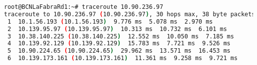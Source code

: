 \begin{lstlisting}[language=bash, caption={Traceroute from BCNLaFrabraRd1 to LEDE-MXN1.}]
root@BCNLaFabraRd1:~# traceroute 10.90.236.97
traceroute to 10.90.236.97 (10.90.236.97), 30 hops max, 38 byte packets
 1  10.1.56.193 (10.1.56.193)  9.776 ms  5.078 ms  2.970 ms
 2  10.139.95.97 (10.139.95.97)  10.313 ms  10.732 ms  6.101 ms
 3  10.38.140.225 (10.38.140.225)  12.552 ms  10.050 ms  7.185 ms
 4  10.139.92.129 (10.139.92.129)  15.783 ms  7.721 ms  9.526 ms
 5  10.90.224.65 (10.90.224.65)  29.962 ms  13.571 ms  16.453 ms
 6  10.139.173.161 (10.139.173.161)  11.361 ms  9.258 ms  9.721 ms
\end{lstlisting}